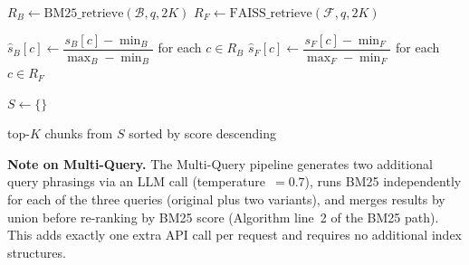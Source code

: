 \documentclass[a4paper,fleqn]{cas-dc}
\begin{document}
\bigskip

\begin{algorithm}[htbp]
\DontPrintSemicolon
{}
\caption{Hybrid Retrieval via Linear Score Interpolation}
\label{alg:hybrid}


$R_B \leftarrow \text{BM25\_retrieve}(\mathcal{B}, q, 2K)$ 
$R_F \leftarrow \text{FAISS\_retrieve}(\mathcal{F}, q, 2K)$ 

$\hat{s}_B[c] \leftarrow \dfrac{s_B[c] - \min_B}{\max_B - \min_B}$ \quad for each $c \in R_B$\;
$\hat{s}_F[c] \leftarrow \dfrac{s_F[c] - \min_F}{\max_F - \min_F}$ \quad for each $c \in R_F$\;

$S \leftarrow \{\}$\;

\Return top-$K$ chunks from $S$ sorted by score descending
\end{algorithm}

\smallskip
\noindent\textbf{Note on Multi-Query.} The Multi-Query pipeline generates two
additional query phrasings via an LLM call (temperature~$= 0.7$), runs
BM25 independently for each of the three queries (original plus two variants),
and merges results by union before re-ranking by BM25 score (Algorithm
line~2 of the BM25 path). This adds exactly one extra API call per request
and requires no additional index structures.
\end{document}
